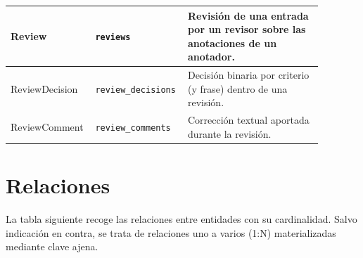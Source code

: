 \begin{longtable}{|p{0.22\linewidth}|p{0.24\linewidth}|p{0.42\linewidth}|}
	Review                  & \texttt{reviews}                      & Revisión de una entrada por un revisor sobre las anotaciones de un anotador.                          \\ \hline
	ReviewDecision          & \texttt{review\_decisions}            & Decisión binaria por criterio (y frase) dentro de una revisión.                                       \\ \hline
	ReviewComment           & \texttt{review\_comments}             & Corrección textual aportada durante la revisión.                                                      \\ \hline
\end{longtable}

\section{Relaciones}

La tabla siguiente recoge las relaciones entre entidades con su cardinalidad.
Salvo indicación en contra, se trata de relaciones uno a varios (1:N)
materializadas mediante clave ajena.


